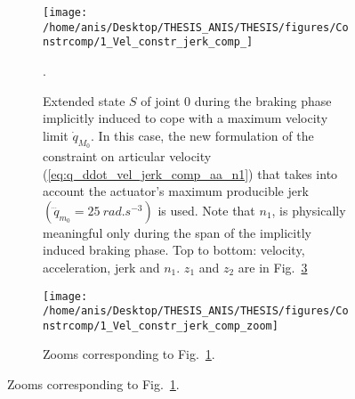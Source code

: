 \begin{figure}[!htbp]
\begin{figure}[!htbp]
\centering
{\texttt{[image: /home/anis/Desktop/THESIS\_ANIS/THESIS/figures/Constrcomp/1\_Vel\_constr\_jerk\_comp\_]}}
\caption{Extended state $S$ of joint $0$ during the braking phase implicitly induced to cope with a maximum velocity limit $\dot{q}_{M_{0}}$. In this case, the new formulation of the constraint on articular velocity (\ref{eq:q_ddot_vel_jerk_comp_aa_n1}) that takes into account the actuator's maximum producible jerk $(\dddot{q}_{m_{0}} = 25~rad.s^{-3})$ is used. Note that $n_1$, is physically meaningful only during the span of the implicitly induced braking phase. Top to bottom: velocity, acceleration, jerk and $n_1$. $z_1$ and $z_2$ are in Fig.~\ref{fig:1_Vel_constr_jerk_comp_zoom}}. 
\label{fig:1_Vel_constr_jerk_comp}
\end{figure}
\begin{figure}[!htbp]
\centering
{\texttt{[image: /home/anis/Desktop/THESIS\_ANIS/THESIS/figures/Constrcomp/1\_Vel\_constr\_jerk\_comp\_zoom]}}
\caption{Zooms corresponding to Fig.~\ref{fig:1_Vel_constr_jerk_comp}.} 
\label{fig:1_Vel_constr_jerk_comp_zoom}
\end{figure}
%
%

\end{figure}
